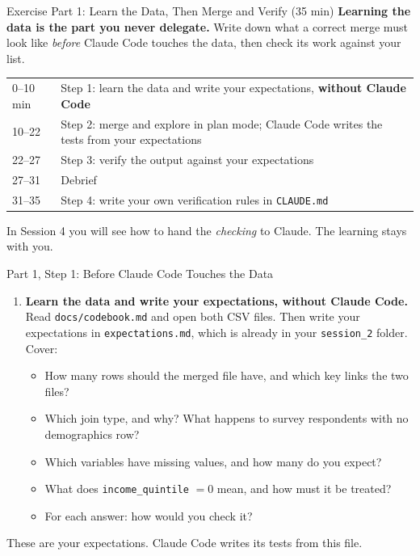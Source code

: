 \documentclass[aspectratio=169, 11pt]{beamer}
\begin{document}
\begin{frame}{Exercise Part 1: Learn the Data, Then Merge and Verify (35 min)}
  \textbf{Learning the data is the part you never delegate.} Write down what a correct merge must look like \textit{before} Claude Code touches the data, then check its work against your list.

  \vspace{0.6em}
  \begin{tabular}{@{}lL{0.78\textwidth}@{}}
    --10 min & Step 1: learn the data and write your expectations, \textbf{without Claude Code} \\
    10--22 & Step 2: merge and explore in plan mode; Claude Code writes the tests from your expectations \\
    22--27 & Step 3: verify the output against your expectations \\
    27--31 & Debrief \\
    31--35 & Step 4: write your own verification rules in \texttt{CLAUDE.md} \\
    \bottomrule
  \end{tabular}

  \vspace{0.6em}
  {\small In Session 4 you will see how to hand the \textit{checking} to Claude. The learning stays with you.}
\end{frame}

\begin{frame}{Part 1, Step 1: Before Claude Code Touches the Data}
  \small
  \begin{enumerate}
    \item \textbf{Learn the data and write your expectations, without Claude Code.} Read \texttt{docs/codebook.md} and open both CSV files. Then write your expectations in \texttt{expectations.md}, which is already in your \texttt{session\_2} folder. Cover:
    \begin{itemize}
      \footnotesize
      \item How many rows should the merged file have, and which key links the two files?
      \item Which join type, and why? What happens to survey respondents with no demographics row?
      \item Which variables have missing values, and how many do you expect?
      \item What does \texttt{income\_quintile} $= 0$ mean, and how must it be treated?
      \item For each answer: how would you check it?
    \end{itemize}
  \end{enumerate}

  \vspace{0.3em}
  \alert{These are your expectations. Claude Code writes its tests from this file.}
\end{frame}
\end{document}
